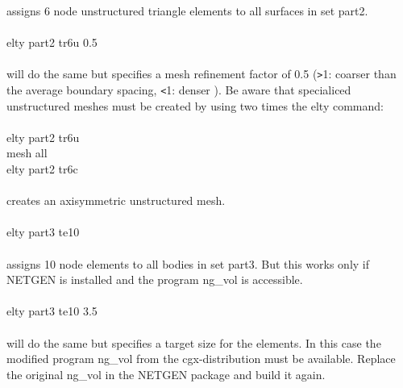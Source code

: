 \documentclass{article}
\begin{document}
assigns 6 node unstructured triangle elements to all surfaces in set part2.\\\\
elty part2 tr6u 0.5\\\\
will do the same but specifies a mesh refinement factor of 0.5 (\verb_>_1: coarser than the average boundary spacing, \verb_<_1: denser ). Be aware that specialiced unstructured meshes must be created by using two times the elty command:\\\\
elty part2 tr6u\\
mesh all\\
elty part2 tr6c\\\\
creates an axisymmetric unstructured mesh.\\\\
elty part3 te10\\\\
assigns 10 node elements to all bodies in set part3. But this works only if NETGEN \cite{NETGEN} is installed and the program ng\_vol is accessible.\\\\
elty part3 te10 3.5\\\\
will do the same but specifies a target size for the elements. In this case the modified program ng\_vol from the cgx-distribution must be available. Replace the original ng\_vol in the NETGEN package and build it again.
\end{document}
